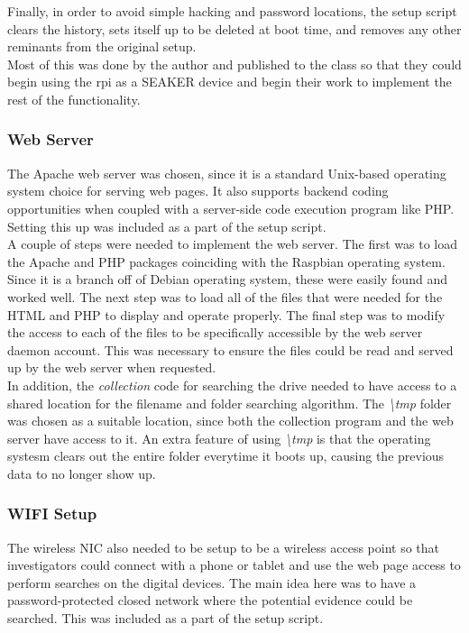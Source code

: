 \documentclass[12pt]{article}
\begin{document}
Finally, in order to avoid simple hacking and password locations, the setup
script clears the history, sets itself up to be deleted at boot time, and removes
any other reminants from the original setup.\\

Most of this was done by the author and published to the class so that they could
begin using the \gls{rpi} as a SEAKER device and begin their work to implement the
rest of the functionality.

\subsubsection{Web Server}

The Apache web server was chosen, since it is a standard Unix-based operating system
choice for serving web pages.  It also supports backend coding opportunities when 
coupled with a server-side code execution program like PHP.  Setting this up was
included as a part of the setup script.\\

A couple of steps were needed to implement the web server.  The first was to
load the Apache and PHP packages coinciding with the Raspbian operating system.  
Since it is a branch off of Debian operating system, these were easily found and
worked well.  The next step was to load all of the files that were needed for
the HTML and PHP to display and operate properly.  The final step was to modify
the access to each of the files to be specifically accessible by the web
server daemon account.  This was necessary to ensure the files could be read and
served up by the web server when requested.\\

In addition, the {\em collection} code for searching the drive needed to have 
access to a shared location for the filename and folder searching algorithm.
The {\em \textbackslash{}tmp} folder was chosen as a suitable location, since
both the collection program and the web server have access to it.  An extra
feature of using {\em \textbackslash{}tmp} is that the operating systesm clears
out the entire folder everytime it boots up, causing the previous data to no
longer show up.\\

\subsubsection{WIFI Setup}

The wireless NIC also needed to be setup to be a wireless access point so that
investigators could connect with a phone or tablet and use the web page access
to perform searches on the digital devices.  The main idea here was to have a 
password-protected closed network where the potential evidence could be searched.
This was included as a part of the setup script.\\
\end{document}
